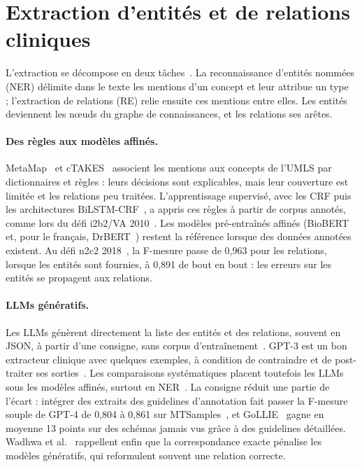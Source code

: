 \section{Extraction d'entités et de relations cliniques}\label{sec:extraction_er}

L'extraction se décompose en deux tâches~\cite{meystre2008extracting,uzuner2011i2b2}. La reconnaissance d'entités nommées (NER) délimite dans le texte les mentions d'un concept et leur attribue un type~\cite{jurafsky2026slp} ; l'extraction de relations (RE) relie ensuite ces mentions entre elles. Les entités deviennent les nœuds du graphe de connaissances, et les relations ses arêtes.

\paragraph{Des règles aux modèles affinés.} MetaMap~\cite{aronson2010metamap} et cTAKES~\cite{savova2010ctakes} associent les mentions aux concepts de l'UMLS par dictionnaires et règles : leurs décisions sont explicables, mais leur couverture est limitée et les relations peu traitées. L'apprentissage supervisé, avec les CRF puis les architectures BiLSTM-CRF~\cite{lample2016neural}, a appris ces règles à partir de corpus annotés, comme lors du défi i2b2/VA 2010~\cite{uzuner2011i2b2}. Les modèles pré-entraînés affinés (BioBERT~\cite{lee2020biobert} et, pour le français, DrBERT~\cite{labrak2023drbert}) restent la référence lorsque des données annotées existent. Au défi n2c2 2018~\cite{henry2020n2c2}, la F-mesure passe de 0,963 pour les relations, lorsque les entités sont fournies, à 0,891 de bout en bout : les erreurs sur les entités se propagent aux relations.

\paragraph{LLMs génératifs.} Les LLMs génèrent directement la liste des entités et des relations, souvent en JSON, à partir d'une consigne, sans corpus d'entraînement~\cite{xu2024genie_survey}. GPT-3 est un bon extracteur clinique avec quelques exemples, à condition de contraindre et de post-traiter ses sorties~\cite{agrawal2022fewshot}. Les comparaisons systématiques placent toutefois les LLMs sous les modèles affinés, surtout en NER~\cite{chen2025benchmarking}. La consigne réduit une partie de l'écart : intégrer des extraits des guidelines d'annotation fait passer la F-mesure souple de GPT-4 de 0,804 à 0,861 sur MTSamples~\cite{hu2024clinicalner}, et GoLLIE~\cite{sainz2024gollie} gagne en moyenne 13 points sur des schémas jamais vus grâce à des guidelines détaillées. Wadhwa et al.~\cite{wadhwa2023revisiting} rappellent enfin que la correspondance exacte pénalise les modèles génératifs, qui reformulent souvent une relation correcte.

